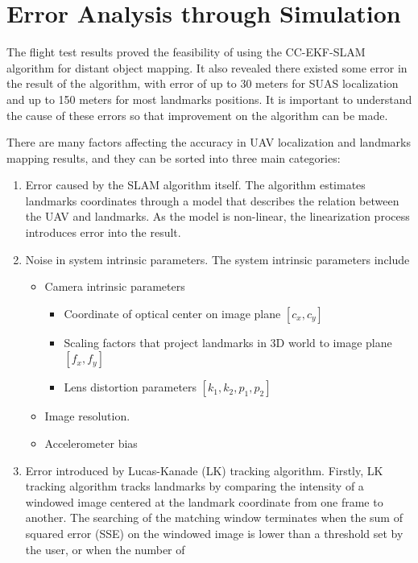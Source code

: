 \chapter{Error Analysis through Simulation}\label{ch:simulation}
The flight test results proved the feasibility of using the CC-EKF-SLAM
algorithm for distant object mapping. It also revealed there existed
some error in the result of the algorithm, with error of up to 30
meters for SUAS localization and up to 150 meters for most landmarks
positions. It is important to understand the cause of these errors so
that improvement on the algorithm can be made.

There are many factors affecting the accuracy in UAV localization and
landmarks mapping results, and they can be sorted into three main
categories:

\begin{enumerate}
  \item Error caused by the SLAM algorithm itself. The algorithm
  estimates landmarks coordinates through a model that describes the
  relation between the UAV and landmarks. As the model is non-linear,
  the linearization process introduces error into the result.
  \item Noise in system intrinsic parameters. The system intrinsic
  parameters include
  \begin{itemize}
    \item Camera intrinsic parameters
    \begin{itemize}
      \item Coordinate of optical center on image plane $[c_{x}, c_{y}]$
      \item Scaling factors that project landmarks in 3D world to image plane $ [f_{x}, f_{y}]$
      \item Lens distortion parameters $[k_{1}, k_{2}, p_{1}, p_{2}]$
    \end{itemize}
    \item Image resolution.
    \item Accelerometer bias %
  \end{itemize}
  \item Error introduced by Lucas-Kanade (LK) tracking algorithm.
  Firstly, LK tracking algorithm tracks landmarks by comparing the
  intensity of a windowed image centered at the landmark coordinate
  from one frame to another. The searching of the matching window
  terminates when the sum of squared error (SSE) on the windowed image
  is lower than a threshold set by the user, or when the number of

\end{enumerate}

